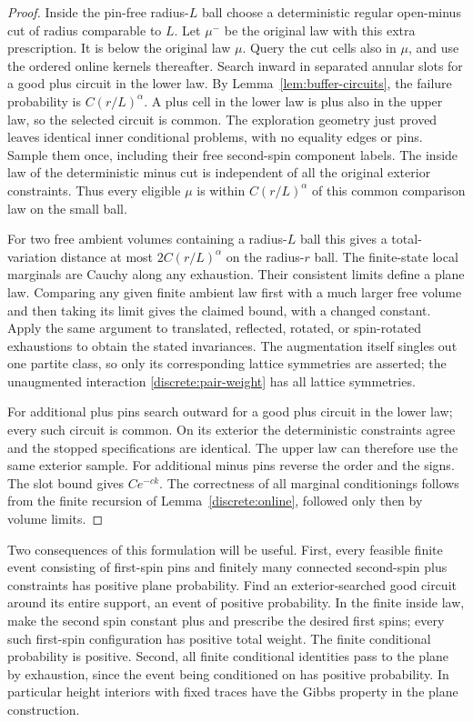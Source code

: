 \begin{proof}
Inside the pin-free radius-$L$ ball choose a deterministic regular
open-minus cut of radius comparable to $L$. Let $\mu^-$ be the original
law with this extra prescription. It is below the original law $\mu$.
Query the cut cells also in $\mu$, and use the ordered online kernels
thereafter. Search inward in separated annular slots for a good plus
circuit in the lower law. By Lemma~\ref{lem:buffer-circuits}, the failure
probability is $C(r/L)^\alpha$. A plus cell in the lower law is plus also
in the upper law, so the selected circuit is common. The exploration
geometry just proved leaves identical inner conditional problems, with
no equality edges or pins. Sample them once, including their free
second-spin component labels. The inside law of the deterministic minus
cut is independent of all the original exterior constraints. Thus every
eligible $\mu$ is within $C(r/L)^\alpha$ of this common comparison law
on the small ball.

For two free ambient volumes containing a radius-$L$ ball this gives a
total-variation distance at most $2C(r/L)^\alpha$ on the radius-$r$ ball.
The finite-state local marginals are Cauchy along any exhaustion. Their
consistent limits define a plane law. Comparing any given finite ambient
law first with a much larger free volume and then taking its limit gives
the claimed bound, with a changed constant. Apply the same argument to
translated, reflected, rotated, or spin-rotated exhaustions to obtain the
stated invariances. The augmentation itself singles out one partite
class, so only its corresponding lattice symmetries are asserted; the
unaugmented interaction \eqref{discrete:pair-weight} has all lattice
symmetries.

For additional plus pins search outward for a good plus circuit in the
lower law; every such circuit is common. On its exterior the deterministic
constraints agree and the stopped specifications are identical. The
upper law can therefore use the same exterior sample. For additional
minus pins reverse the order and the signs. The slot bound gives
$Ce^{-ck}$. The correctness of all marginal conditionings follows from
the finite recursion of Lemma~\ref{discrete:online}, followed only then by
volume limits.
\end{proof}

Two consequences of this formulation will be useful. First, every feasible
finite event consisting of first-spin pins and finitely many connected
second-spin plus constraints has positive plane probability. Find an
exterior-searched good circuit around its entire support, an event of
positive probability. In the finite inside law, make the second spin
constant plus and prescribe the desired first spins; every such first-spin
configuration has positive total weight. The finite conditional
probability is positive. Second, all finite conditional identities pass
to the plane by exhaustion, since the event being conditioned on has
positive probability. In particular height interiors with fixed traces
have the Gibbs property in the plane construction.

